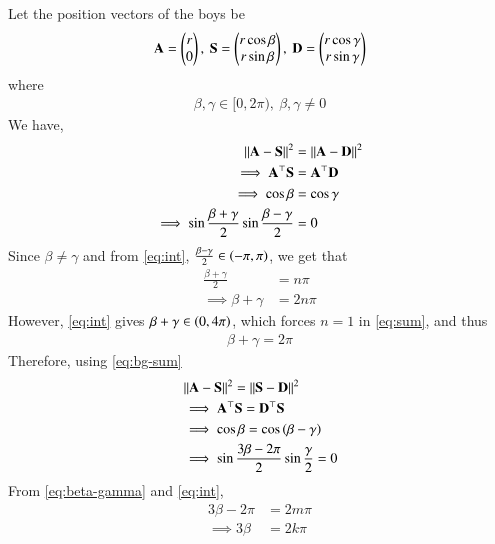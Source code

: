 \documentclass[journal,12pt,twocolumn]{IEEEtran}
\renewcommand{\vec}[1]{\boldsymbol{\mathbf{#1}}}
\begin{document}
\begin{enumerate}
    \solution Let the position vectors of the boys be
    \begin{align}
        \vec{A} = \myvec{r\\0},\ \vec{S} = \myvec{r\cos\beta\\r\sin\beta},\ \vec{D} = \myvec{r\cos\gamma\\r\sin\gamma}
        \label{eq:pos-vec-def}
    \end{align}
    where
    \begin{align}
        \beta, \gamma \in [0,2\pi),\ \beta, \gamma \neq 0
        \label{eq:int}
    \end{align}
    We have,
    \begin{align}
        \norm{\vec{A}-\vec{S}}^2 &= \norm{\vec{A}-\vec{D}}^2 \\
        \implies \vec{A}^\top\vec{S} &= \vec{A}^\top\vec{D} \\
        \implies \cos\beta &= \cos\gamma \\
        \implies \sin\frac{\beta+\gamma}{2}\sin\frac{\beta-\gamma}{2} &= 0
    \end{align}
    Since $\beta \neq \gamma$ and from \eqref{eq:int}, 
    $\frac{\beta-\gamma}{2} \in \left(-\pi,\pi\right)$, we get that
    \begin{align}
        \frac{\beta+\gamma}{2} &= n\pi \\
        \implies \beta+\gamma &= 2n\pi
        \label{eq:sum}
    \end{align}
    However, \eqref{eq:int} gives $\beta + \gamma \in \left(0,4\pi\right)$, which forces
    $n = 1$ in \eqref{eq:sum}, and thus
    \begin{align}
        \beta + \gamma = 2\pi
        \label{eq:bg-sum}
    \end{align}
    Therefore, using \eqref{eq:bg-sum}
    \begin{align}
        &\norm{\vec{A}-\vec{S}}^2 = \norm{\vec{S}-\vec{D}}^2 \\
        &\implies \vec{A}^\top\vec{S} = \vec{D}^\top\vec{S} \\
        &\implies \cos\beta = \cos\brak{\beta-\gamma} \\
        &\implies \sin\frac{3\beta-2\pi}{2}\sin\frac{\gamma}{2} = 0
        \label{eq:beta-gamma}
    \end{align}
    From \eqref{eq:beta-gamma} and \eqref{eq:int},
    \begin{align}
        3\beta -2\pi &= 2m\pi \\
        \implies 3\beta &= 2k\pi \\

\end{align}
\end{enumerate}
\end{document}
